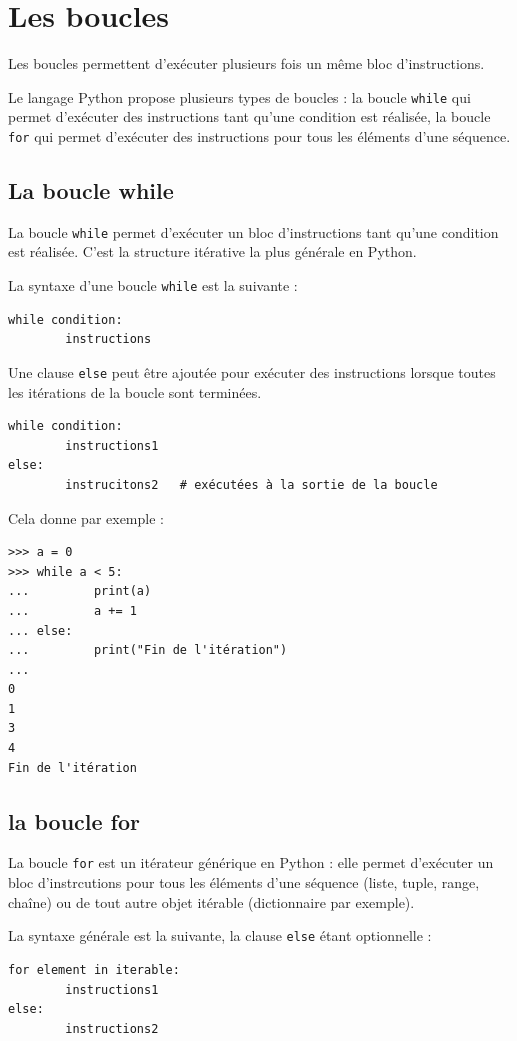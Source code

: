 \documentclass[12pt, a4paper]{article}
\begin{document}
\section{Les boucles}
\label{sec:boucles}
Les boucles permettent d'exécuter plusieurs fois un même bloc d'instructions. 

Le langage Python propose plusieurs types de boucles : la boucle \lstinline{while} qui permet d'exécuter des instructions tant qu'une condition est réalisée, la boucle \lstinline{for} qui permet d'exécuter des instructions pour tous les éléments d'une séquence.


\subsection{La boucle while}
La boucle \lstinline{while} permet d'exécuter un bloc d'instructions tant qu'une condition est réalisée. C'est la structure itérative la plus générale en Python.

La syntaxe d'une boucle \lstinline{while} est la suivante :
\begin{lstlisting}
while condition:
		instructions
\end{lstlisting}

Une clause \lstinline{else} peut être ajoutée pour exécuter des instructions lorsque toutes les itérations de la boucle sont terminées.
\begin{lstlisting}
while condition:
		instructions1
else:
		instrucitons2	# exécutées à la sortie de la boucle
\end{lstlisting}

Cela donne par exemple :
\begin{lstlisting}
>>> a = 0
>>> while a < 5:
... 		print(a)
... 		a += 1
...	else:
...			print("Fin de l'itération")
...
0
1
3
4
Fin de l'itération
\end{lstlisting}


\subsection{la boucle for}
La boucle \lstinline{for} est un itérateur générique en Python : elle permet d'exécuter un bloc d'instrcutions pour tous les éléments d'une séquence (liste, tuple, range, chaîne) ou de tout autre objet itérable (dictionnaire par exemple).

La syntaxe générale est la suivante, la clause \lstinline{else} étant optionnelle :
\begin{lstlisting}
for element in iterable:
		instructions1
else:
		instructions2
\end{lstlisting}
\end{document}
